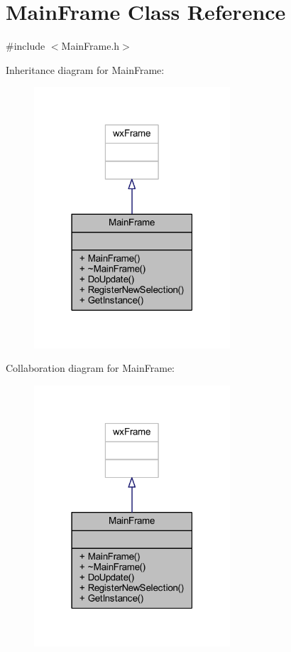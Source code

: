 \hypertarget{class_main_frame}{}\section{Main\+Frame Class Reference}
\label{class_main_frame}


{\ttfamily \#include $<$Main\+Frame.\+h$>$}



Inheritance diagram for Main\+Frame\+:
\nopagebreak
\begin{figure}[H]
\begin{center}
\leavevmode
\includegraphics[width=207pt]{class_main_frame__inherit__graph}
\end{center}
\end{figure}


Collaboration diagram for Main\+Frame\+:
\nopagebreak
\begin{figure}[H]
\begin{center}
\leavevmode
\includegraphics[width=207pt]{class_main_frame__coll__graph}
\end{center}
\end{figure}
